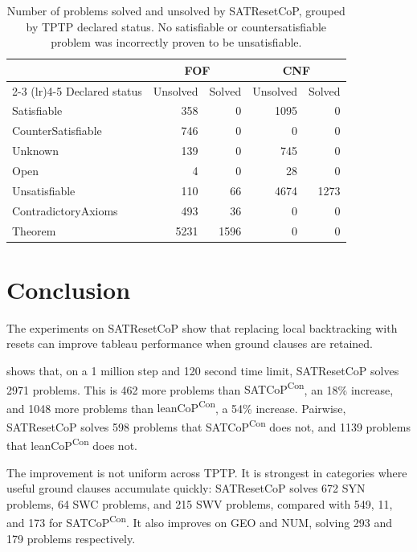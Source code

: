 \documentclass{EasyChair3.5/easychair}
\newcommand{\step}[1]{\textsf{#1}}
\newcommand{\cop}[1]{\textsf{#1}}
\newcommand{\leancopc}{\cop{leanCoP\textsuperscript{Con}}}
\newcommand{\satcopc}{\cop{SATCoP\textsuperscript{Con}}}
\begin{document}
\begin{table}[h]
	\centering
	\footnotesize
	\begin{tabular}{lrrrr}
		\toprule
			& \multicolumn{2}{c}{FOF} & \multicolumn{2}{c}{CNF} \\
		\cmidrule(lr){2-3}
		\cmidrule(lr){4-5}
			Declared status & Unsolved & Solved & Unsolved & Solved \\
		\midrule
			Satisfiable         & 358  & 0    & 1095 & 0    \\
			CounterSatisfiable  & 746  & 0    & 0    & 0    \\
		\addlinespace[1ex]
			Unknown             & 139  & 0    & 745  & 0    \\
			Open                & 4    & 0    & 28   & 0    \\
		\addlinespace[1ex]
			Unsatisfiable       & 110  & 66   & 4674 & 1273 \\
			ContradictoryAxioms & 493  & 36   & 0    & 0    \\
			Theorem             & 5231 & 1596 & 0    & 0    \\
		\bottomrule
	\end{tabular}
	\caption{Number of problems solved and unsolved by \cop{SATResetCoP}, grouped by TPTP declared status. No satisfiable or countersatisfiable problem was incorrectly proven to be unsatisfiable.}
	\label{sat_proof}
\end{table}

\section{Conclusion}

The experiments on \cop{SATResetCoP} show that replacing local backtracking with resets can improve tableau performance when ground clauses are retained.

 shows that, on a 1 million step and 120 second time limit, \cop{SATResetCoP} solves \num{2971} problems.
This is \num{462} more problems than \satcopc{}, an 18\% increase, and \num{1048} more problems than \leancopc{}, a 54\% increase.
Pairwise, \cop{SATResetCoP} solves \num{598} problems that \satcopc{} does not, and \num{1139} problems that \leancopc{} does not.

The improvement is not uniform across TPTP.
It is strongest in categories where useful ground clauses accumulate quickly: \cop{SATResetCoP} solves \num{672} \step{SYN} problems, \num{64} \step{SWC} problems, and \num{215} \step{SWV} problems, compared with \num{549}, \num{11}, and \num{173} for \satcopc{}.
It also improves on \step{GEO} and \step{NUM}, solving \num{293} and \num{179} problems respectively.
\end{document}
